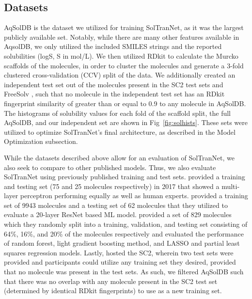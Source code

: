 \documentclass[journal=jmcmar,manuscript=article]{achemso}
\begin{document}
\subsection{Datasets}
AqSolDB\cite{AqSol} is the dataset we utilized for training SolTranNet, as it was the largest publicly available set.
Notably, while there are many other features available in AqsolDB, we only utilized the included SMILES strings and the reported solubilities (logS, S in mol/L).
We then utilized RDkit\cite{rdkit} to calculate the Murcko scaffolds of the molecules, in order to cluster the molecules and generate a 3-fold clustered cross-validation (CCV) split of the data.
We additionally created an independent test set out of the molecules present in the SC2 test sets \cite{llinas} and FreeSolv \cite{freesolv}, such that no molecule in the independent test set has an RDkit fingerprint similarity of greater than or equal to 0.9 to any molecule in AqSolDB.
The histograms of solubility values for each fold of the scaffold split, the full AqSolDB, and our independent set are shown in Fig~\ref{fig:solhists}.
These sets were utilized to optimize SolTranNet's final architecture, as described in the Model Optimization subsection.

While the datasets described above allow for an evaluation of SolTranNet, we also seek to compare to other published models.
Thus, we also evaluate SolTranNet using previously published training and test sets.
\citet{boobier} provided a training and testing set (75 and 25 molecules respectively) in 2017 that showed a multi-layer perceptron performing equally as well as human experts.
\citet{cui} provided a training set of 9943 molecules and a testing set of 62 molecules that they utilized to evaluate a 20-layer ResNet based ML model.
\citet{lovric} provided a set of 829 molecules which they randomly split into a training, validation, and testing set consisting of 64\%, 16\%, and 20\% of the molecules respectively and evaluated the performance of random forest, light gradient boosting method, and LASSO and partial least squares regression models.
Lastly, \citet{llinas} hosted the SC2, wherein two test sets were provided and participants could utilize any training set they desired, provided that no molecule was present in the test sets.
As such, we filtered AqSolDB such that there was no overlap with any molecule present in the SC2 test set (determined by identical RDkit fingerprints) to use as a new training set.
\end{document}
